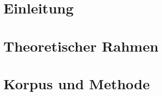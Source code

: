 

\newcommand{\universitaet}{Universität Heidelberg}
\newcommand{\seminar}{Germanistisches Seminar}
\newcommand{\semester}{Wintersemester JJJJ/JJJJ}
\newcommand{\lehrveranstaltung}{Titel der Lehrveranstaltung}
\newcommand{\dozent}{Prof. Dr. Name Nachname}
\newcommand{\arbeitstitel}{Titel der Arbeit}
\newcommand{\untertitel}{Untertitel der Arbeit}
\newcommand{\autorname}{Vorname Nachname}
\newcommand{\matrikelnr}{0000000}
\newcommand{\studiengang}{Studiengang}
\newcommand{\email}{vorname.nachname@stud.uni-heidelberg.de}
\newcommand{\abgabedatum}{TT.MM.JJJJ}





\thispagestyle{empty}
\tableofcontents
\newpage


\setcounter{page}{1}

\section{Einleitung}
\lipsum[1-2]


\section{Theoretischer Rahmen}
\lipsum[3-4]


\section{Korpus und Methode}
\lipsum[5-6]


